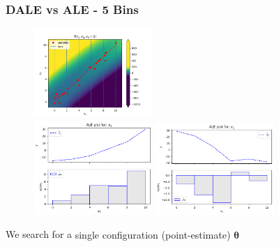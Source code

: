 \documentclass{beamer}
\newcommand{\thetab}{\boldsymbol{\theta}}
\begin{document}
\begin{frame}
  \frametitle{DALE vs ALE - 5 Bins}
  \begin{figure}[ht]
    \centering
    \includegraphics[width=0.4\textwidth]{./figures/bin_splitting_5_bins.png}\\
    \includegraphics[width=0.4\textwidth]{./figures/dale_5_bins.png}
    \includegraphics[width=0.4\textwidth]{./figures/ale_5_bins.png}
    \label{}
  \end{figure}
  \noindent\makebox[\linewidth]{\rule{\paperwidth}{0.4pt}}
  We search for a \alert{single configuration (point-estimate) \( \hat{\thetab}\) }
\end{frame}
\end{document}
